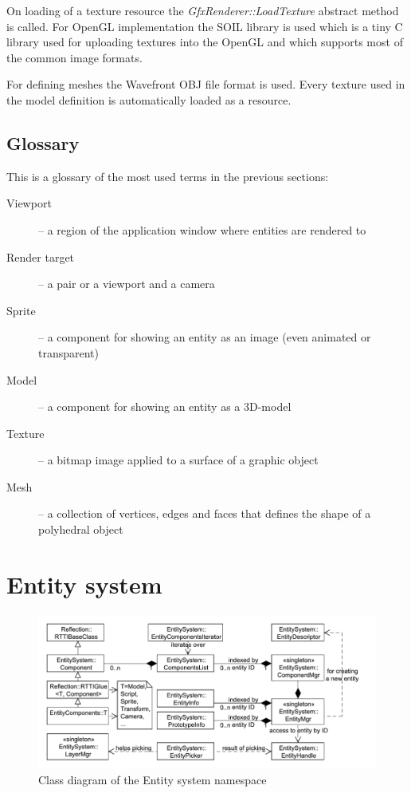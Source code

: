 \documentclass[a4paper, 12pt]{report}
\begin{document}
On loading of a texture resource the \emph{GfxRenderer::LoadTexture} abstract method is called. For OpenGL implementation the SOIL library is used which is a tiny C library used for uploading textures into the OpenGL and which supports most of the common image formats.

For defining meshes the Wavefront OBJ file format \cite{obj} is used. Every texture used in the model definition is automatically loaded as a resource.
 
\section{Glossary}
This is a glossary of the most used terms in the previous sections:

\begin{description}
  \item[Viewport] -- a region of the application window where entities are rendered to
  \item[Render target] -- a pair or a viewport and a camera
  \item[Sprite] -- a component for showing an entity as an image (even animated or transparent)
  \item[Model] -- a component for showing an entity as a 3D-model
  \item[Texture] -- a bitmap image applied to a surface of a graphic object
  \item[Mesh] -- a collection of vertices, edges and faces that defines the shape of a polyhedral object
\end{description}



\chapter{Entity system}

\begin{figure}[htbp]
	\centering
		\includegraphics[width=1\textwidth]{EntitySystemClassDiagram.pdf}
	\caption{Class diagram of the Entity system namespace}
	\label{fig:entitysystem-diagram}
\end{figure}
\end{document}
